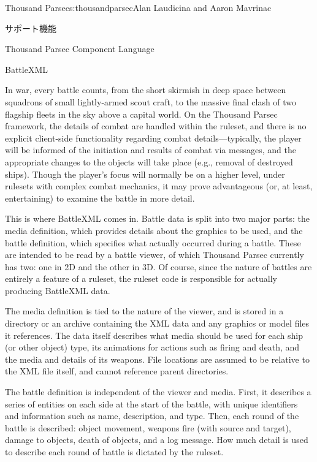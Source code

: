 \begin{aosachapter}{Thousand Parsec}{s:thousandparsec}{Alan Laudicina and Aaron Mavrinac}
\begin{aosasect1}{サポート機能}
\begin{aosasect2}{Thousand Parsec Component Language}
\end{aosasect2}

\begin{aosasect2}{BattleXML}

In war, every battle counts, from the short skirmish in deep space
between squadrons of small lightly-armed scout craft, to the massive
final clash of two flagship fleets in the sky above a capital
world. On the Thousand Parsec framework, the details of combat are
handled within the ruleset, and there is no explicit client-side
functionality regarding combat details---typically, the player will be
informed of the initiation and results of combat via messages, and the
appropriate changes to the objects will take place (e.g., removal of
destroyed ships). Though the player's focus will normally be on a
higher level, under rulesets with complex combat mechanics, it may
prove advantageous (or, at least, entertaining) to examine the battle
in more detail.

This is where BattleXML comes in. Battle data is split into two major
parts: the media definition, which provides details about the graphics
to be used, and the battle definition, which specifies what actually
occurred during a battle. These are intended to be read by a battle
viewer, of which Thousand Parsec currently has two: one in 2D and the
other in 3D\@. Of course, since the nature of battles are entirely a
feature of a ruleset, the ruleset code is responsible for actually
producing BattleXML data.

The media definition is tied to the nature of the viewer, and is
stored in a directory or an archive containing the XML data and any
graphics or model files it references. The data itself describes what
media should be used for each ship (or other object) type, its
animations for actions such as firing and death, and the media and
details of its weapons. File locations are assumed to be relative to
the XML file itself, and cannot reference parent directories.

The battle definition is independent of the viewer and media. First,
it describes a series of entities on each side at the start of the
battle, with unique identifiers and information such as name,
description, and type. Then, each round of the battle is described:
object movement, weapons fire (with source and target), damage to
objects, death of objects, and a log message. How much detail is used
to describe each round of battle is dictated by the ruleset.


\end{aosasect2}
\end{aosasect1}
\end{aosachapter}
